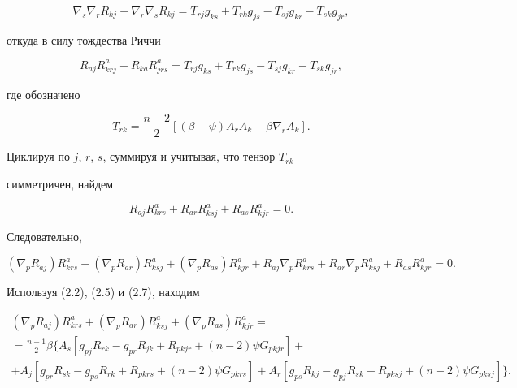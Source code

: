 $$ 


\nabla_s\nabla_r R_{kj}-\nabla_r\nabla_s R_{kj}= 


T_{rj}g_{ks}+T_{rk}g_{js}-T_{sj}g_{kr}-T_{sk}g_{jr}, 


$$ 


откуда в силу тождества Риччи 


$$ 


R_{aj}R^a_{krj}+R_{ka}R^a_{jrs}=T_{rj}g_{ks} 


+T_{rk}g_{js}-T_{sj}g_{kr}-T_{sk}g_{jr}, 


$$ 


где обозначено 


$$ 


T_{rk}=\frac{n-2}{2}[(\beta-\psi)A_r A_k-\beta\nabla_r A_k]. 


$$ 


Циклируя по $j$, $r$, $s$, суммируя и учитывая, что тензор $T_{rk}$ 


симметричен, найдем 


\begin{equation} 


R_{aj}R^a_{krs}+R_{ar}R^a_{ksj}+R_{as}R^a_{kjr}=0. 


\end{equation} 


Следовательно, 


\begin{equation} 


(\nabla_p R_{aj})R^a_{krs}+(\nabla_p R_{ar})R^a_{ksj}+ 


(\nabla_p R_{as})R^a_{kjr}+ 


R_{aj}\nabla_p R^a_{krs}+R_{ar}\nabla_p R^a_{ksj}+ 


R_{as}R^a_{kjr}=0. 


\end{equation} 


Используя (2.2), (2.5) и (2.7), находим 


\begin{multline*} 


(\nabla_p R_{aj})R^a_{krs}+(\nabla_p R_{ar})R^a_{ksj}+ 


(\nabla_p R_{as})R^a_{kjr}= \\ 


=\frac{n-1}{2}\beta\{A_s[g_{pj}R_{rk}-g_{pr}R_{jk}+ 


R_{pkjr}+(n-2)\psi G_{pkjr}]+ \\ 


+A_j[g_{pr}R_{sk}-g_{ps}R_{rk}+R_{pkrs}+(n-2)\psi G_{pkrs}]+


A_r[g_{ps}R_{kj}-g_{pj}R_{sk}+R_{pksj}+(n-2)\psi G_{pksj}]\}. 


\end{multline*} 


